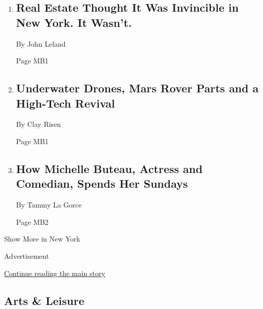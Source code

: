 \begin{enumerate}
\def\labelenumi{\arabic{enumi}.}
\item
  \href{/2019/11/29/nyregion/real-estate-industry-nyc.html}{}

  \hypertarget{real-estate-thought-it-was-invincible-in-new-york-it-wasnt}{%
  \subsection{Real Estate Thought It Was Invincible in New York. It
  Wasn't.}\label{real-estate-thought-it-was-invincible-in-new-york-it-wasnt}}

  By John Leland

  Page MB1
\item
  \href{/2019/11/28/nyregion/tech-manufacturing-nyc.html}{}

  \hypertarget{underwater-drones-mars-rover-parts-and-a-high-tech-revival}{%
  \subsection{Underwater Drones, Mars Rover Parts and a High-Tech
  Revival}\label{underwater-drones-mars-rover-parts-and-a-high-tech-revival}}

  By Clay Risen

  Page MB1
\item
  \href{/2019/11/29/nyregion/michelle-buteau.html}{}

  \hypertarget{how-michelle-buteau-actress-and-comedian-spends-her-sundays}{%
  \subsection{How Michelle Buteau, Actress and Comedian, Spends Her
  Sundays}\label{how-michelle-buteau-actress-and-comedian-spends-her-sundays}}

  By Tammy La Gorce

  Page MB2
\end{enumerate}

Show More in New York

Advertisement

\protect\hyperlink{after-mid3}{Continue reading the main story}

\hypertarget{arts--leisure}{%
\subsection{Arts \& Leisure}\label{arts--leisure}}

